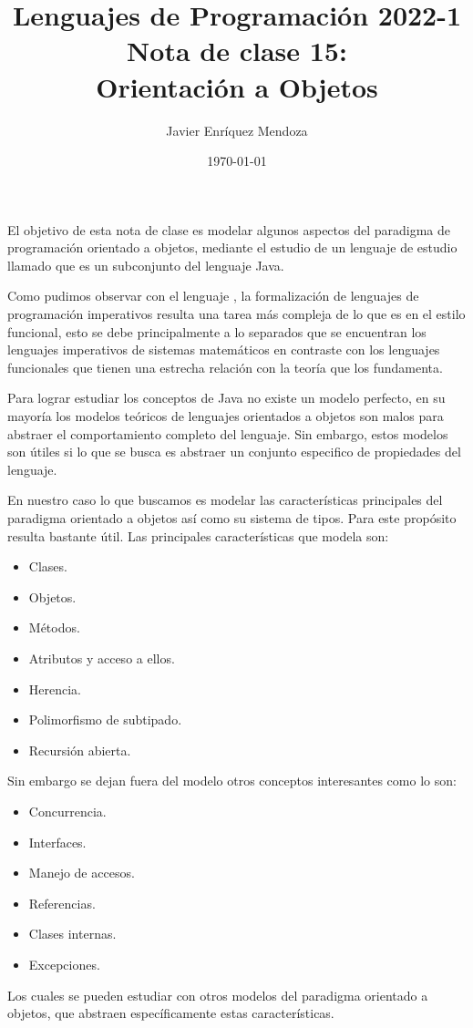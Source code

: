 \documentclass[12pt]{extarticle}
\title{\LARGE 
Lenguajes de Programación 2022-1\\ 
Nota de clase 15: \jpp  \\
\color{ForestGreen} Orientación a Objetos}
\author{Javier Enríquez Mendoza}
\date{\today}
\begin{document}
\maketitle

El objetivo de esta nota de clase es modelar algunos aspectos del paradigma de programación orientado a objetos, mediante el estudio de un lenguaje de estudio llamado \jpp que es un subconjunto del lenguaje Java. 

Como pudimos observar con el lenguaje \tinyc, la formalización de lenguajes de programación imperativos resulta una tarea más compleja de lo que es en el estilo funcional, esto se debe principalmente a lo separados que se encuentran los lenguajes imperativos de sistemas matemáticos en contraste con los lenguajes funcionales que tienen una estrecha relación con la teoría que los fundamenta.

Para lograr estudiar los conceptos de Java no existe un modelo perfecto, en su mayoría los modelos teóricos de lenguajes orientados a objetos son malos para abstraer el comportamiento completo del lenguaje. Sin embargo, estos modelos son útiles si lo que se busca es abstraer un conjunto especifico de propiedades del lenguaje. 

En nuestro caso lo que buscamos es modelar las características principales del paradigma orientado a objetos así como su sistema de tipos. Para este propósito \jpp resulta bastante útil. Las principales características que modela \jpp son: 

\begin{itemize}
	\item Clases. 
	\item Objetos.
	\item Métodos.
	\item Atributos y acceso a ellos.
	\item Herencia.
	\item Polimorfismo de subtipado.
	\item Recursión abierta.
\end{itemize}
Sin embargo se dejan fuera del modelo otros conceptos interesantes como lo son:
\begin{itemize}
	\item Concurrencia.
	\item Interfaces.
	\item Manejo de accesos.
	\item Referencias.
	\item Clases internas.
	\item Excepciones.
\end{itemize}
Los cuales se pueden estudiar con otros modelos del paradigma orientado a objetos, que abstraen específicamente estas características.
\end{document}
